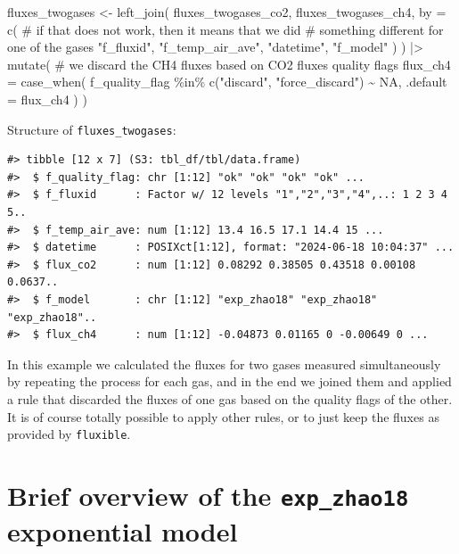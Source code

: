 \documentclass[
  letterpaper,
  DIV=11,
  numbers=noendperiod]{scrartcl}
\newenvironment{Shaded}{\begin{snugshade}}{\end{snugshade}}
\newcommand{\AttributeTok}[1]{\textcolor[rgb]{0.40,0.45,0.13}{#1}}
\newcommand{\CommentTok}[1]{\textcolor[rgb]{0.37,0.37,0.37}{#1}}
\newcommand{\ConstantTok}[1]{\textcolor[rgb]{0.56,0.35,0.01}{#1}}
\newcommand{\FunctionTok}[1]{\textcolor[rgb]{0.28,0.35,0.67}{#1}}
\newcommand{\NormalTok}[1]{\textcolor[rgb]{0.00,0.23,0.31}{#1}}
\newcommand{\OtherTok}[1]{\textcolor[rgb]{0.00,0.23,0.31}{#1}}
\newcommand{\SpecialCharTok}[1]{\textcolor[rgb]{0.37,0.37,0.37}{#1}}
\newcommand{\StringTok}[1]{\textcolor[rgb]{0.13,0.47,0.30}{#1}}
\begin{document}
\begin{Shaded}
\begin{Highlighting}[]
\NormalTok{fluxes\_twogases }\OtherTok{\textless{}{-}} \FunctionTok{left\_join}\NormalTok{(}
\NormalTok{  fluxes\_twogases\_co2,}
\NormalTok{  fluxes\_twogases\_ch4,}
  \AttributeTok{by =} \FunctionTok{c}\NormalTok{(}
  \CommentTok{\# if that does not work, then it means that we did}
  \CommentTok{\# something different for one of the gases}
    \StringTok{"f\_fluxid"}\NormalTok{,}
    \StringTok{"f\_temp\_air\_ave"}\NormalTok{,}
    \StringTok{"datetime"}\NormalTok{,}
    \StringTok{"f\_model"}
\NormalTok{    )}
\NormalTok{) }\SpecialCharTok{|\textgreater{}}
\FunctionTok{mutate}\NormalTok{( }\CommentTok{\# we discard the CH4 fluxes based on CO2 fluxes quality flags}
  \AttributeTok{flux\_ch4 =} \FunctionTok{case\_when}\NormalTok{(}
\NormalTok{    f\_quality\_flag }\SpecialCharTok{\%in\%} \FunctionTok{c}\NormalTok{(}\StringTok{"discard"}\NormalTok{, }\StringTok{"force\_discard"}\NormalTok{) }\SpecialCharTok{\textasciitilde{}} \ConstantTok{NA}\NormalTok{,}
    \AttributeTok{.default =}\NormalTok{ flux\_ch4}
\NormalTok{  )}
\NormalTok{)}
\end{Highlighting}
\end{Shaded}

Structure of \texttt{fluxes\_twogases}:

\begin{verbatim}
#> tibble [12 x 7] (S3: tbl_df/tbl/data.frame)
#>  $ f_quality_flag: chr [1:12] "ok" "ok" "ok" "ok" ...
#>  $ f_fluxid      : Factor w/ 12 levels "1","2","3","4",..: 1 2 3 4 5..
#>  $ f_temp_air_ave: num [1:12] 13.4 16.5 17.1 14.4 15 ...
#>  $ datetime      : POSIXct[1:12], format: "2024-06-18 10:04:37" ...
#>  $ flux_co2      : num [1:12] 0.08292 0.38505 0.43518 0.00108 0.0637..
#>  $ f_model       : chr [1:12] "exp_zhao18" "exp_zhao18" "exp_zhao18"..
#>  $ flux_ch4      : num [1:12] -0.04873 0.01165 0 -0.00649 0 ...
\end{verbatim}

In this example we calculated the fluxes for two gases measured
simultaneously by repeating the process for each gas, and in the end we
joined them and applied a rule that discarded the fluxes of one gas
based on the quality flags of the other. It is of course totally
possible to apply other rules, or to just keep the fluxes as provided by
\texttt{fluxible}.

\section{\texorpdfstring{Brief overview of the \texttt{exp\_zhao18}
exponential
model}{Brief overview of the exp\_zhao18 exponential model}}\label{sec-theory}
\end{document}
